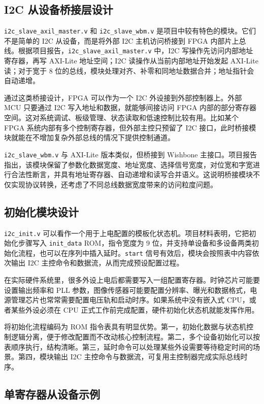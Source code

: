 \documentclass[12pt,a4paper]{article}
\numberwithin{equation}{section}
\begin{document}
\subsection{I2C 从设备桥接层设计}

\texttt{i2c\_slave\_axil\_master.v} 和 \texttt{i2c\_slave\_wbm.v} 是项目中较有特色的模块。它们不是简单的 I2C 从设备，而是将外部 I2C 主机访问桥接到 FPGA 内部片上总线。根据项目报告，\texttt{i2c\_slave\_axil\_master.v} 中，I2C 写操作先访问内部地址寄存器，再写 AXI-Lite 地址空间；I2C 读操作从当前内部地址开始发起 AXI-Lite 读；对于宽于 8 位的总线，模块处理对齐、补零和同地址数据合并；地址指针会自动递增。

通过这类桥接设计，FPGA 可以作为一个 I2C 外设接到外部控制器上。外部 MCU 只要通过 I2C 写入地址和数据，就能够间接访问 FPGA 内部的部分寄存器空间。这对系统调试、板级管理、状态读取和低速控制比较有用。比如某个 FPGA 系统内部有多个控制寄存器，但外部主控只预留了 I2C 接口，此时桥接模块就能在不增加复杂外部总线的情况下提供控制通道。

\texttt{i2c\_slave\_wbm.v} 与 AXI-Lite 版本类似，但桥接到 Wishbone 主接口。项目报告指出，该模块保留了参数化数据宽度、地址宽度、选择信号宽度，对位宽和字宽进行合法性断言，并具有地址寄存器、自动递增和读写合并语义。这说明桥接模块不仅实现协议转换，还考虑了不同总线数据宽度带来的访问粒度问题。

\subsection{初始化模块设计}

\texttt{i2c\_init.v} 可以看作一个用于上电配置的模板化状态机。项目材料表明，它把初始化步骤写入 \texttt{init\_data} ROM，指令宽度为 9 位，并支持单设备和多设备两类初始化流程，也可以在序列中插入延时。\texttt{start} 信号有效后，模块会按照表中内容依次输出 I2C 主控命令和数据流，从而完成预设配置过程。

在实际硬件系统里，很多外设上电后都需要写入一组配置寄存器。时钟芯片可能要设置输出频率和 PLL 参数，图像传感器可能要配置分辨率、曝光和数据格式，电源管理芯片也常常需要配置电压轨和启动时序。如果系统中没有嵌入式 CPU，或者某些外设必须在 CPU 正式工作前完成配置，硬件初始化状态机就能发挥作用。

将初始化流程编码为 ROM 指令表具有明显优势。第一，初始化数据与状态机控制逻辑分离，便于修改配置而不改动核心控制流程。第二，多个设备初始化可以按表顺序执行，结构清晰。第三，延时命令可以处理某些外设需要等待稳定时间的场景。第四，模块输出 I2C 主控命令与数据流，可复用主控制器完成实际总线时序。

\subsection{单寄存器从设备示例}
\end{document}
